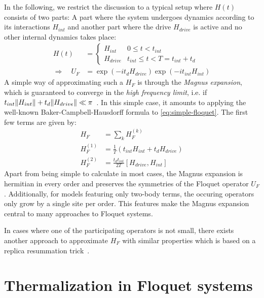 In the following, we restrict the discussion to a typical setup where $H(t)$ consists of two parts: A part where the system undergoes dynamics according to its interactions $H_{int}$ and another part where the drive $H_{drive}$ is active and no other internal dynamics takes place:
\begin{align}
	H(t) &= \begin{cases}
		H_{int} & 0 \leq t < t_{int}\\
		H_{drive} & t_{int} \leq t < T=t_{int}+t_{d}
	\end{cases}\\
\Rightarrow\quad U_F &= \exp\left(-it_{d}H_{drive}\right)\exp\left(-it_{int}H_{int}\right) \label{eq:simple-floquet}
\end{align}
A simple way of approximating such a $H_F$ is through the \emph{Magnus expansion}, which is guaranteed to converge in the \emph{high frequency limit}, i.e. if $t_{int}\lVert H_{int}\rVert+t_{d}\lVert H_{drive}\rVert \ll \pi $~\cite{blanesMagnusExpansionIts2009}. In this simple case, it amounts to applying the well-known Baker-Campbell-Hausdorff formula to \autoref{eq:simple-floquet}. The first few terms are given by:
\begin{align}
	H_F &= \sum_k H_F^{(k)}\\
	H_F^{(1)} &= \frac{1}{T}\left(t_{int} H_{int} + t_{d}H_{drive}\right)\\
	H_F^{(2)} &= \frac{t_{d}t_{int}}{2T} \left[H_{drive}, H_{int}\right]
\end{align}
Apart from being simple to calculate in most cases, the Magnus expansion is hermitian in every order and preserves the symmetries of the Floquet operator $U_F$. Additionally, for models featuring only two-body terms, the occuring operators only grow by a single site per order. This features make the Magnus expansion central to many approaches to Floquet systems.

In cases where one of the participating operators is not small, there exists another approach to approximate $H_F$ with similar properties which is based on a replica resummation trick~\cite{vajnaReplicaResummationBakerCampbellHausdorff2018}.

\section{Thermalization in Floquet systems}

